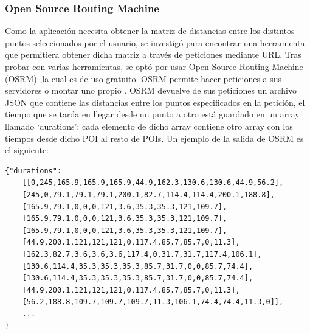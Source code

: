 \subsubsection[OSRM]{Open Source Routing Machine}
Como la aplicación necesita obtener la matriz de distancias entre los distintos puntos seleccionados por el usuario, se investigó para encontrar una herramienta que permitiera obtener dicha matriz a través de peticiones mediante URL.\newline
Tras probar con varias herramientas, se optó por usar Open Source Routing Machine (OSRM) \cite{osmr},la cual es de uso gratuito. OSRM permite hacer peticiones a sus servidores \cite{osmr_doc} o montar uno propio \cite{osmr_backend}.\newline
OSRM devuelve de sus peticiones un archivo JSON que contiene las distancias entre los puntos especificados en la petición, el tiempo que se tarda en llegar desde un punto a otro está guardado en un array llamado \enquote*{durations}; cada elemento de dicho array contiene otro array con los tiempos desde dicho POI al resto de POIs. Un ejemplo de la salida de OSRM es el siguiente:
\begin{lstlisting}[caption=Salida de OSRM.]
{"durations":
	[[0,245,165.9,165.9,165.9,44.9,162.3,130.6,130.6,44.9,56.2],
	[245,0,79.1,79.1,79.1,200.1,82.7,114.4,114.4,200.1,188.8],
	[165.9,79.1,0,0,0,121,3.6,35.3,35.3,121,109.7],
	[165.9,79.1,0,0,0,121,3.6,35.3,35.3,121,109.7],
	[165.9,79.1,0,0,0,121,3.6,35.3,35.3,121,109.7],
	[44.9,200.1,121,121,121,0,117.4,85.7,85.7,0,11.3],
	[162.3,82.7,3.6,3.6,3.6,117.4,0,31.7,31.7,117.4,106.1],
	[130.6,114.4,35.3,35.3,35.3,85.7,31.7,0,0,85.7,74.4],
	[130.6,114.4,35.3,35.3,35.3,85.7,31.7,0,0,85.7,74.4],
	[44.9,200.1,121,121,121,0,117.4,85.7,85.7,0,11.3],
	[56.2,188.8,109.7,109.7,109.7,11.3,106.1,74.4,74.4,11.3,0]],
	...
}
\end{lstlisting}

